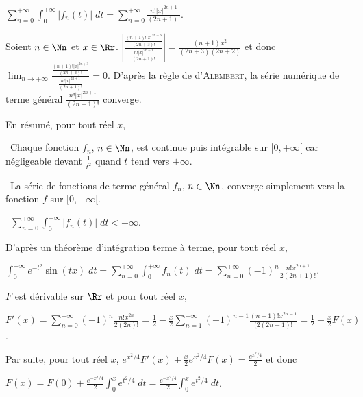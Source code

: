 {{\begin{center}
$\sum_{n=0}^{+\infty}\int_{0}^{+\infty}|f_n(t)|\;dt=\sum_{n=0}^{+\infty}\frac{n!|x|^{2n+1}}{(2n+1)!}$.
\end{center}

Soient $n\in\Nn$ et $x\in\Rr$. $\left|\frac{\frac{(n+1)!|x|^{2n+3}}{(2n+3)!}}{\frac{n!|x|^{2n+1}}{(2n+1)!}}\right|=\frac{(n+1)x^2}{(2n+3)(2n+2)}$ et donc $\lim_{n \rightarrow +\infty}\frac{\frac{(n+1)!|x|^{2n+3}}{(2n+3)!}}{\frac{n!|x|^{2n+1}}{(2n+1)!}}=0$. D'après la règle de d'\textsc{Alembert}, la série numérique de terme général $\frac{n!|x|^{2n+1}}{(2n+1)!}$ converge.

En résumé, pour tout réel $x$,

\textbullet~Chaque fonction $f_n$, $n\in\Nn$, est continue puis intégrable sur $[0,+\infty[$ car négligeable devant $\frac{1}{t^2}$ quand $t$ tend vers $+\infty$.

\textbullet~La série de fonctions de terme général $f_n$, $n\in\Nn$, converge simplement vers la fonction $f$ sur $[0,+\infty[$.

\textbullet~$\sum_{n=0}^{+\infty}\int_{0}^{+\infty}|f_n(t)|\;dt<+\infty$.

D'après un théorème d'intégration terme à terme, pour tout réel $x$,

\begin{center}
$\int_{0}^{+\infty}e^{-t^2}\sin(tx)\;dt=\sum_{n=0}^{+\infty}\int_{0}^{+\infty}f_n(t)\;dt=\sum_{n=0}^{+\infty}(-1)^n\frac{n!x^{2n+1}}{2(2n+1)!}$.
\end{center}

\begin{center}
\end{center}

$F$ est dérivable sur $\Rr$ et pour tout réel $x$,

\begin{center}
$F'(x)=\sum_{n=0}^{+\infty}(-1)^n\frac{n!x^{2n}}{2(2n)!}=\frac{1}{2}-\frac{x}{2}\sum_{n=1}^{+\infty}(-1)^{n-1}\frac{(n-1)!x^{2n-1}}{(2(2n-1)!}=\frac{1}{2}-\frac{x}{2}F(x)$.
\end{center}

Par suite, pour tout réel $x$, $e^{x^2/4}F'(x) +\frac{x}{2}e^{x^2/4}F(x)=\frac{e^{x^2/4}}{2}$ et donc

\begin{center}
$F(x)=F(0)+\frac{e^{-x^2/4}}{2}\int_{0}^{x}e^{t^2/4}\;dt =\frac{e^{-x^2/4}}{2}\int_{0}^{x}e^{t^2/4}\;dt$.
\end{center}

\begin{center}
\end{center}
}
}
